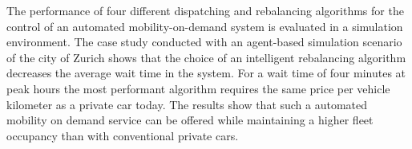The performance of four different dispatching and rebalancing algorithms for the
control of an automated mobility-on-demand system is evaluated in a simulation environment.
The case study conducted with an agent-based simulation scenario of the city of Zurich
shows that the choice of an intelligent rebalancing algorithm decreases the average
 wait time in the system. For a wait time of four minutes at peak hours the most performant algorithm requires the same price
per vehicle kilometer as a private car today.
The results show that such a automated mobility on demand service can be offered
while maintaining a higher fleet occupancy than with conventional private cars.

